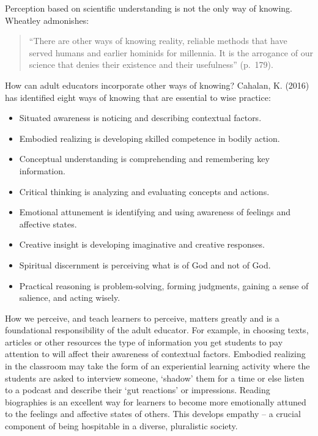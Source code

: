 \documentclass[
]{book}
\providecommand{\tightlist}{%
  \setlength{\itemsep}{0pt}\setlength{\parskip}{0pt}}
\begin{document}
Perception based on scientific understanding is not the only way of knowing. Wheatley admonishes:

\begin{quote}
``There are other ways of knowing reality, reliable methods that have served humans and earlier hominids for millennia. It is the arrogance of our science that denies their existence and their usefulness'' (p.~179).
\end{quote}

How can adult educators incorporate other ways of knowing? Cahalan, K. (2016) has identified eight ways of knowing that are essential to wise practice:

\begin{itemize}
\tightlist
\item
  Situated awareness is noticing and describing contextual factors.
\item
  Embodied realizing is developing skilled competence in bodily action.
\item
  Conceptual understanding is comprehending and remembering key information.
\item
  Critical thinking is analyzing and evaluating concepts and actions.
\item
  Emotional attunement is identifying and using awareness of feelings and affective states.
\item
  Creative insight is developing imaginative and creative responses.
\item
  Spiritual discernment is perceiving what is of God and not of God.
\item
  Practical reasoning is problem-solving, forming judgments, gaining a sense of salience, and acting wisely.
\end{itemize}

How we perceive, and teach learners to perceive, matters greatly and is a foundational responsibility of the adult educator. For example, in choosing texts, articles or other resources the type of information you get students to pay attention to will affect their awareness of contextual factors. Embodied realizing in the classroom may take the form of an experiential learning activity where the students are asked to interview someone, `shadow' them for a time or else listen to a podcast and describe their `gut reactions' or impressions. Reading biographies is an excellent way for learners to become more emotionally attuned to the feelings and affective states of others. This develops empathy -- a crucial component of being hospitable in a diverse, pluralistic society.
\end{document}
